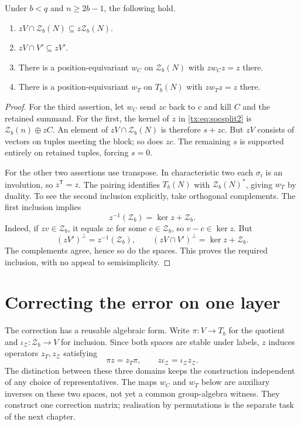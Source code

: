 \begin{lemma}\label{tx:lem:layer-interface}
Under $b<q$ and $n\ge2b-1$, the following hold.
\begin{enumerate}
\item $zV\cap \mathcal Z_b(N)\subseteq z\mathcal Z_b(N)$.
\item $zV\cap V'\subseteq zV'$.
\item There is a position-equivariant $w_C$ on $\mathcal Z_b(N)$ with $zw_Cz=z$ there.
\item There is a position-equivariant $w_T$ on $T_b(N)$ with $zw_Tz=z$ there.
\end{enumerate}
\end{lemma}
\begin{proof}
For the third assertion, let $w_C$ send $zc$ back to $c$ and kill $C$ and the retained summand. For the first, the kernel of $z$ in \eqref{tx:eq:socsplit2} is $\mathcal Z_b(n)\oplus zC$. An element of $zV\cap \mathcal Z_b(N)$ is therefore $s+zc$. But $zV$ consists of vectors on tuples meeting the block; so does $zc$. The remaining $s$ is supported entirely on retained tuples, forcing $s=0$.

For the other two assertions use transpose. In characteristic two each $\sigma_i$ is an involution, so $z^{\mathsf T}=z$. The pairing identifies $T_b(N)$ with $\mathcal Z_b(N)^*$, giving $w_T$ by duality. To see the second inclusion explicitly, take orthogonal complements. The first inclusion implies
\[z^{-1}(\mathcal Z_b)=\ker z+\mathcal Z_b.
\]
Indeed, if $zv\in \mathcal Z_b$, it equals $zc$ for some $c\in \mathcal Z_b$, so $v-c\in\ker z$. But
\[(zV')^\perp=z^{-1}(\mathcal Z_b),\qquad
(zV\cap V')^\perp=\ker z+\mathcal Z_b.
\]
The complements agree, hence so do the spaces. This proves the required inclusion, with no appeal to semisimplicity.
\end{proof}

\section{Correcting the error on one layer}\label{tx:sec:layerstep}
The correction has a reusable algebraic form. Write $\pi:V\to T_b$ for the quotient and $\iota_{\mathcal Z}:\mathcal Z_b\to V$ for inclusion. Since both spaces are stable under labels, $z$ induces operators $z_T,z_{\mathcal Z}$ satisfying
\[
       \pi z=z_T\pi,\qquad z\iota_{\mathcal Z}=\iota_{\mathcal Z}z_{\mathcal Z}.
\]
The distinction between these three domains keeps the construction independent of any choice of representatives.
The maps $w_C$ and $w_T$ below are auxiliary inverses on these two
spaces, not yet a common group-algebra witness. They construct one
correction matrix; realisation by permutations is the separate task
of the next chapter.

